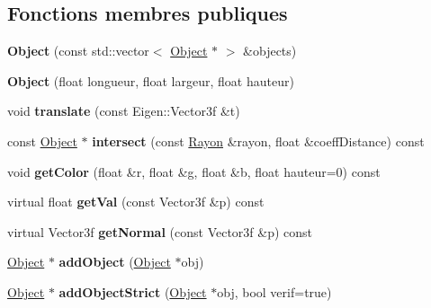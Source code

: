 \subsection*{Fonctions membres publiques}
\begin{DoxyCompactItemize}
\item 
\hypertarget{class_object_a05ec7d1275bc0a8cadc51941c42ec1e2}{}{\bfseries Object} (const std\+::vector$<$ \hyperlink{class_object}{Object} $\ast$ $>$ \&objects)\label{class_object_a05ec7d1275bc0a8cadc51941c42ec1e2}

\item 
\hypertarget{class_object_ad4fdeb3d2d8675d0ecba70a15ed35d73}{}{\bfseries Object} (float longueur, float largeur, float hauteur)\label{class_object_ad4fdeb3d2d8675d0ecba70a15ed35d73}

\item 
\hypertarget{class_object_a6cdc55f9709fdf344cde8795be8114e5}{}void {\bfseries translate} (const Eigen\+::\+Vector3f \&t)\label{class_object_a6cdc55f9709fdf344cde8795be8114e5}

\item 
\hypertarget{class_object_a64cde974370c8926abd1a9ffaf92da6b}{}const \hyperlink{class_object}{Object} $\ast$ {\bfseries intersect} (const \hyperlink{class_rayon}{Rayon} \&rayon, float \&coeff\+Distance) const \label{class_object_a64cde974370c8926abd1a9ffaf92da6b}

\item 
\hypertarget{class_object_a070ab50cdc8ae9881d1faa5ca6e767bf}{}void {\bfseries get\+Color} (float \&r, float \&g, float \&b, float hauteur=0) const \label{class_object_a070ab50cdc8ae9881d1faa5ca6e767bf}

\item 
\hypertarget{class_object_a5056bff54ad4d845aaa47c5e1f5f23bb}{}virtual float {\bfseries get\+Val} (const Vector3f \&p) const \label{class_object_a5056bff54ad4d845aaa47c5e1f5f23bb}

\item 
\hypertarget{class_object_abb9e6990153b6826b7a4dad96535b517}{}virtual Vector3f {\bfseries get\+Normal} (const Vector3f \&p) const \label{class_object_abb9e6990153b6826b7a4dad96535b517}

\item 
\hypertarget{class_object_af78ed86ec38d44cc5938dd5651ffb57b}{}\hyperlink{class_object}{Object} $\ast$ {\bfseries add\+Object} (\hyperlink{class_object}{Object} $\ast$obj)\label{class_object_af78ed86ec38d44cc5938dd5651ffb57b}

\item 
\hypertarget{class_object_a10db13aced5ec34970801a0c70399336}{}\hyperlink{class_object}{Object} $\ast$ {\bfseries add\+Object\+Strict} (\hyperlink{class_object}{Object} $\ast$obj, bool verif=true)\label{class_object_a10db13aced5ec34970801a0c70399336}

\end{DoxyCompactItemize}
